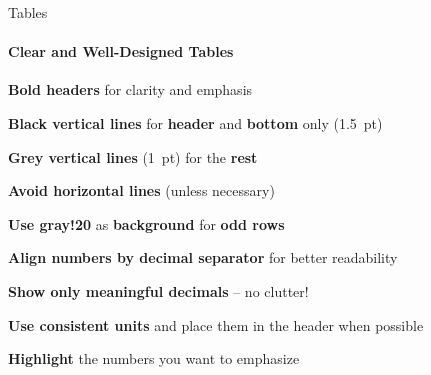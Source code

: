 \documentclass[aspectratio=169]{beamer}
\begin{document}
\begin{frame}{Tables}
    \framesubtitle{Clear and Well-Designed Tables}

    \vspace{-0.7cm}
    \begin{minipage}[t]{0.49\textwidth}
        \begin{coloredblock}
            \vspace{0.2cm}
            \begin{tugitemize}
                \item \footnotesize \textbf{Bold headers} for clarity and emphasis
                \item \textbf{Black vertical lines} for \textbf{header} and \textbf{bottom} only (1.5~pt) 
                \item \textbf{Grey vertical lines} (1~pt) for the \textbf{rest}
                \item \footnotesize \textbf{Avoid horizontal lines} (unless necessary)
                \item \footnotesize \textbf{Use gray!20} as \textbf{background} for \textbf{odd rows}
            \end{tugitemize}
        \end{coloredblock}
        \vspace{0.2cm}
        \begin{coloredblock}
            \vspace{0.2cm}
            \begin{tugitemize}
                \item \footnotesize \textbf{Align numbers by decimal separator} for better readability
                \item \footnotesize \textbf{Show only meaningful decimals} – no clutter!
                \item \footnotesize \textbf{Use consistent units} and place them in the header when possible
                \item \footnotesize \textbf{Highlight} the numbers you want to emphasize
            \end{tugitemize}
        \end{coloredblock}
    \end{minipage}
    \hfill
    \begin{minipage}[t]{0.49\textwidth}
        \vspace{2cm}

\end{minipage}
\end{frame}
\end{document}
